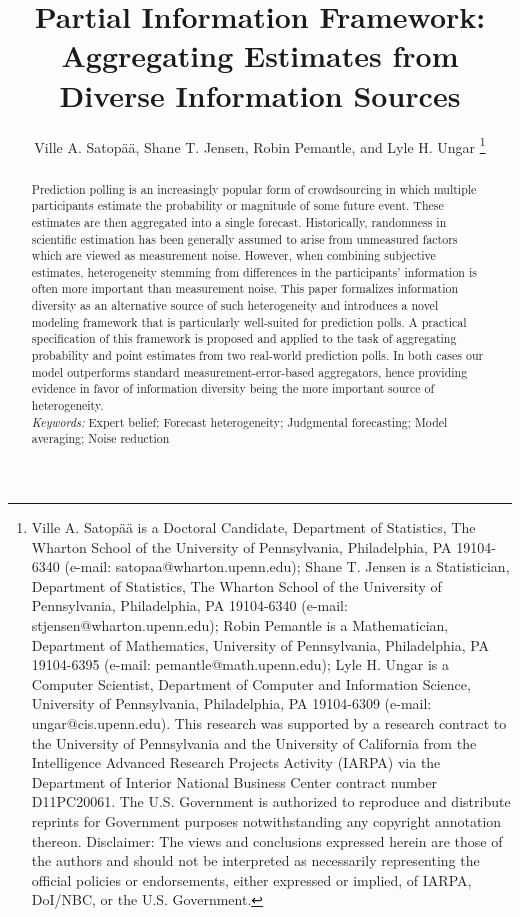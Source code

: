 \documentclass[11pt]{article}
\title{Partial Information Framework: Aggregating Estimates from Diverse Information Sources}
\author{
Ville A. Satop\"a\"a, Shane T. Jensen, Robin Pemantle, and Lyle H. Ungar \thanks{Ville A. Satop\"a\"a is a Doctoral Candidate, Department of Statistics, The Wharton School of the University of Pennsylvania, Philadelphia, PA 19104-6340 (e-mail: satopaa@wharton.upenn.edu); Shane T. Jensen is a Statistician, Department of Statistics, The Wharton School of the University of Pennsylvania, Philadelphia, PA 19104-6340 (e-mail: stjensen@wharton.upenn.edu); Robin Pemantle is a Mathematician, Department of Mathematics, University of Pennsylvania, Philadelphia, PA 19104-6395 (e-mail: pemantle@math.upenn.edu); Lyle H. Ungar is a Computer Scientist, Department of Computer and Information Science, University of Pennsylvania, Philadelphia, PA 19104-6309 (e-mail: ungar@cis.upenn.edu). This research was supported by a research contract to the University
of Pennsylvania and the University of California from the Intelligence
Advanced Research Projects Activity (IARPA) via the Department of
Interior National Business Center contract number D11PC20061. The
U.S. Government is authorized to reproduce and distribute reprints for
Government purposes notwithstanding any copyright annotation
thereon. Disclaimer: The views and conclusions expressed herein are
those of the authors and should not be interpreted as necessarily
representing the official policies or endorsements, either expressed
or implied, of IARPA, DoI/NBC, or the U.S. Government.}}
\date{\vspace{-8.5ex}}
\theoremstyle{definition}
\theoremstyle{definition}
\begin{document}
\maketitle


\begin{abstract}
Prediction polling is an increasingly popular form of crowdsourcing in
which multiple participants estimate the probability or magnitude of
some future event. These estimates are then aggregated into a single
forecast. Historically, randomness in scientific estimation has been
generally assumed to arise from unmeasured factors which are viewed as
measurement noise. However, when combining subjective estimates, heterogeneity
stemming from differences in the participants' information is often
more important than measurement noise. This paper formalizes
information diversity as an alternative source of such heterogeneity
and introduces a novel modeling framework that is particularly
well-suited for prediction polls. A practical specification of this
framework is proposed and applied to the task of aggregating
probability and point estimates from two real-world prediction
polls. In both cases our model outperforms standard
measurement-error-based aggregators, hence providing evidence in favor
of information diversity being the more important source of
heterogeneity.
\\
\textit{Keywords:} Expert belief; Forecast heterogeneity; Judgmental forecasting; Model
averaging; Noise reduction
\end{abstract}
\end{document}
